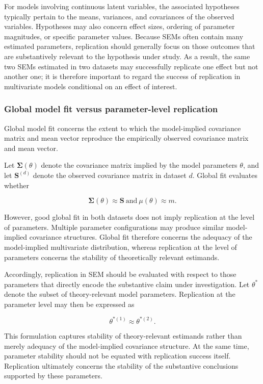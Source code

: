 \documentclass[
  12pt,
  letterpaper,
  man]{apa7}
\begin{document}
For models involving continuous latent variables, the associated
hypotheses typically pertain to the means, variances, and covariances of
the observed variables. Hypotheses may also concern effect sizes,
ordering of parameter magnitudes, or specific parameter values. Because
SEMs often contain many estimated parameters, replication should
generally focus on those outcomes that are substantively relevant to the
hypothesis under study. As a result, the same two SEMs estimated in two
datasets may successfully replicate one effect but not another one; it
is therefore important to regard the success of replication in
multivariate models conditional on an effect of interest.

\subsubsection{Global model fit versus parameter-level
replication}\label{global-model-fit-versus-parameter-level-replication}

Global model fit concerns the extent to which the model-implied
covariance matrix and mean vector reproduce the empirically observed
covariance matrix and mean vector.

Let \(\boldsymbol{\Sigma}(\theta)\) denote the covariance matrix implied
by the model parameters \(\theta\), and let \(\mathbf{S}^{(d)}\) denote
the observed covariance matrix in dataset \(d\). Global fit evaluates
whether

\[\boldsymbol{\Sigma}(\theta) \approx \mathbf{S}\ \text{and}\ \mu(\theta) \approx m.\]

However, good global fit in both datasets does not imply replication at
the level of parameters. Multiple parameter configurations may produce
similar model-implied covariance structures. Global fit therefore
concerns the adequacy of the model-implied multivariate distribution,
whereas replication at the level of parameters concerns the stability of
theoretically relevant estimands.

Accordingly, replication in SEM should be evaluated with respect to
those parameters that directly encode the substantive claim under
investigation. Let \(\theta^*\) denote the subset of theory-relevant
model parameters. Replication at the parameter level may then be
expressed as

\[
\theta^{*(1)}
\approx
\theta^{*(2)}.
\]

This formulation captures stability of theory-relevant estimands rather
than merely adequacy of the model-implied covariance structure. At the
same time, parameter stability should not be equated with replication
success itself. Replication ultimately concerns the stability of the
substantive conclusions supported by these parameters.
\end{document}
